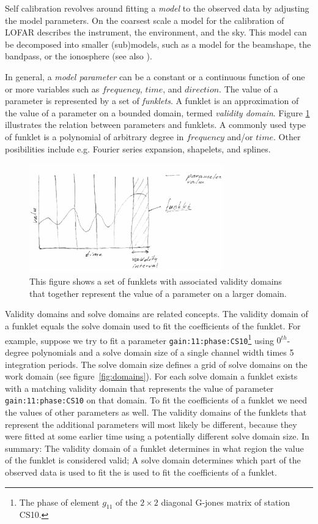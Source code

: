 \documentclass[10pt]{lofar}
\begin{document}
Self calibration revolves around fitting a \emph{model} to the observed data by
adjusting the model parameters. On the coarsest scale a model for the
calibration of LOFAR describes the instrument, the environment, and the sky.
This model can be decomposed into smaller (sub)models, such as a model for the
beamshape, the bandpass, or the ionosphere (see also
\cite[sec.2]{LOFAR-ASTRON-SDD-050}).

In general, a \emph{model parameter} can be a constant or a continuous function
of one or more variables such as $frequency$, $time$, and $direction$. The value
of a parameter is represented by a set of \emph{funklets}. A funklet is an
approximation of the value of a parameter on a bounded domain, termed
\emph{validity domain}. Figure \ref{fig:funklet} illustrates the relation
between parameters and funklets. A commonly used type of funklet is a polynomial
of arbitrary degree in $frequency$ and/or $time$. Other posibilities include
e.g. Fourier series expansion, shapelets, and splines.

\begin{figure}[htbp]
\centering
\includegraphics[width=0.75\textwidth]{images/funklet.eps}
\caption{This figure shows a set of funklets with associated validity domains
that together represent the value of a parameter on a larger domain.}
\label{fig:funklet}
\end{figure}

Validity domains and solve domains are related concepts. The validity domain of
a funklet equals the solve domain used to fit the coefficients of the funklet.
For example, suppose we try to fit a parameter
\texttt{gain:11:phase:CS10}\footnote{The phase of element $g_{11}$ of the $2
\times 2$ diagonal G-jones matrix of station CS10.} using $0^{th}$-degree
polynomials and a solve domain size of a single channel width times 5
integration periods. The solve domain size defines a grid of solve domains on
the work domain (see figure~\ref{fig:domains}). For each solve domain a funklet
exists with a matching validity domain that represents the value of parameter
\texttt{gain:11:phase:CS10} on that domain. To fit the coefficients of a funklet
we need the values of other parameters as well. The validity domains of the
funklets that represent the additional parameters will most likely be different,
because they were fitted at some earlier time using a potentially different
solve domain size. In summary: The validity domain of a funklet determines in
what region the value of the funklet is considered valid; A solve domain
determines which part of the observed data is used to fit the is used to fit the
coefficients of a funklet.
\end{document}
